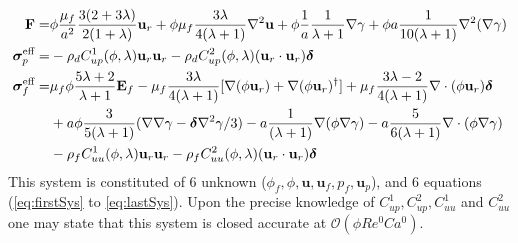 \begin{align}
    \textbf{F}=&
    \phi
    \frac{\mu_f}{a^2}
    \frac{3(2+3\lambda)}{2(1+\lambda)}\textbf{u}_r
    + \phi\mu_f  \frac{3\lambda}{4(\lambda +1)} \grad^2 \textbf{u}
    + \phi \frac{1}{a}\frac{1}{\lambda +1} \grad \gamma
    + \phi a \frac{1}{10(\lambda +1)}\grad^2(\grad\gamma)\\
    \bm\sigma_p^\text{eff}
    =&
    -\rho_d C^1_{up}(\phi,\lambda) \textbf{u}_r \textbf{u}_r
    -\rho_d C^2_{up}(\phi,\lambda) (\textbf{u}_r \cdot \textbf{u}_r)\bm\delta\\
    \bm\sigma_f^\text{eff}
    =&
     \mu_f \phi \frac{5\lambda +2}{\lambda+1} \textbf{E}_f
    - \mu_f \frac{3\lambda}{4(\lambda+1)} [
    \grad(\phi \textbf{u}_r)
    + \grad(\phi \textbf{u}_r)^\dagger]
    + \mu_f \frac{3\lambda - 2}{4(\lambda+1)} \div(\phi \textbf{u}_r)  \bm\delta\nonumber\\
    &+ a\phi \frac{3}{5(\lambda+1)}(\grad\grad\gamma-\bm\delta \grad^2\gamma/3)
    - a \frac{1}{(\lambda+1)}\grad (\phi \grad \gamma)
    - a \frac{5}{6(\lambda+1)}\div (\phi \grad \gamma)
    \nonumber \\
    &-\rho_f C^1_{uu}(\phi,\lambda)  \textbf{u}_r \textbf{u}_r
    -\rho_f C^2_{uu} (\phi,\lambda) (\textbf{u}_r \cdot \textbf{u}_r)\bm\delta
    \label{eq:sigma_feffff}
\end{align}
This system is constituted of 6 unknown ($\phi_f,\phi,\textbf{u},\textbf{u}_f,p_f,\textbf{u}_p$), and 6 equations (\ref{eq:firstSys} to \ref{eq:lastSys}).  
Upon the precise knowledge of $C^1_{up}, C^2_{up}, C^1_{uu}$ and $C^2_{uu}$ one may state that this system is closed accurate at $\mathcal{O}(\phi Re^0 Ca^0)$. 

